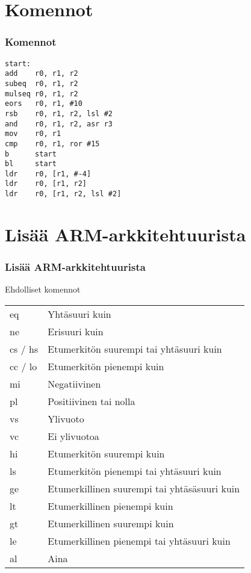 \documentclass{beamer}
\begin{document}
\section{Komennot}
\begin{frame}[fragile]
    \frametitle{Komennot}
    \begin{verbatim}
start:
add    r0, r1, r2
subeq  r0, r1, r2
mulseq r0, r1, r2
eors   r0, r1, #10
rsb    r0, r1, r2, lsl #2
and    r0, r1, r2, asr r3
mov    r0, r1
cmp    r0, r1, ror #15
b      start
bl     start
ldr    r0, [r1, #-4]
ldr    r0, [r1, r2]
ldr    r0, [r1, r2, lsl #2]
    \end{verbatim}
\end{frame}

\section{Lisää ARM-arkkitehtuurista}
\begin{frame}
    \frametitle{Lisää ARM-arkkitehtuurista}
    Ehdolliset komennot
    \centering
    \begin{tabular}{p{} | p{}}
        \hline
        eq & Yhtäsuuri kuin \\
        ne & Erisuuri kuin \\
        cs / hs & Etumerkitön suurempi tai yhtäsuuri kuin \\
        cc / lo & Etumerkitön pienempi kuin \\
        mi & Negatiivinen \\
        pl & Positiivinen tai nolla \\
        vs & Ylivuoto \\
        vc & Ei ylivuotoa \\
        hi & Etumerkitön suurempi kuin \\
        ls & Etumerkitön pienempi tai yhtäsuuri kuin \\
        ge & Etumerkillinen suurempi tai yhtäsäsuuri kuin \\
        lt & Etumerkillinen pienempi kuin \\
        gt & Etumerkillinen suurempi kuin \\
        le & Etumerkillinen pienempi tai yhtäsuuri kuin \\
        al & Aina \\
    \end{tabular}
\end{frame}
\end{document}
